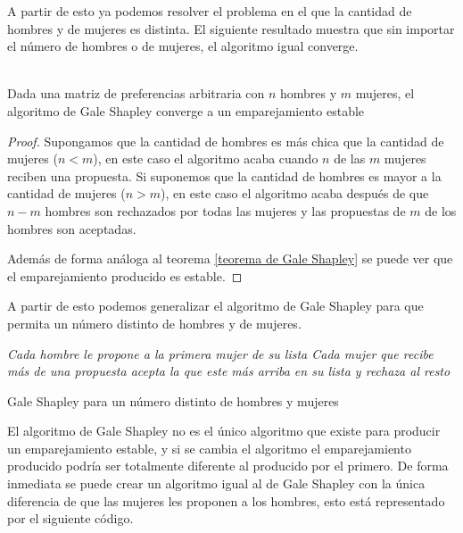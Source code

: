 A partir de esto ya podemos resolver el problema en el que la cantidad de hombres y de mujeres es distinta. El siguiente resultado muestra que sin importar el número de hombres o de mujeres, el algoritmo igual converge. 

\begin{teo} \cite{GaleShapley} \\
Dada una matriz de preferencias arbitraria con $n$ hombres y $m$ mujeres, el algoritmo de Gale Shapley converge a un emparejamiento estable
\end{teo}
\begin{proof}
Supongamos que la cantidad de hombres es más chica que la cantidad de mujeres ($n<m$), en este caso el algoritmo acaba cuando $n$ de las $m$ mujeres reciben una propuesta. Si suponemos que la cantidad de hombres es mayor a la cantidad de mujeres ($n>m$), en este caso el algoritmo acaba después de que $n-m$ hombres son rechazados por todas las mujeres y las propuestas de $m$ de los hombres son aceptadas. 

Además de forma análoga al teorema \ref{teorema de Gale Shapley} se puede ver que el emparejamiento producido es estable.
\end{proof}
A partir de esto podemos generalizar el algoritmo de Gale Shapley para que permita un número distinto de hombres y de mujeres. 

\IncMargin{1em}
\begin{Algoritmo}[H]
\BlankLine
\emph{Cada hombre le propone a la primera mujer de su lista\; Cada mujer que recibe más de una propuesta acepta la que este más arriba en su lista y rechaza al resto \; }
\caption{Gale Shapley para un número distinto de hombres y mujeres}
\end{Algoritmo}
\DecMargin{1em}


El algoritmo de Gale Shapley no es el único algoritmo que existe para producir un emparejamiento estable, y si se cambia el algoritmo el emparejamiento producido podría ser totalmente diferente al producido por el primero. De forma inmediata se puede crear un algoritmo igual al de Gale Shapley con la única diferencia de que las mujeres les proponen a los hombres, esto está representado por el siguiente código.


